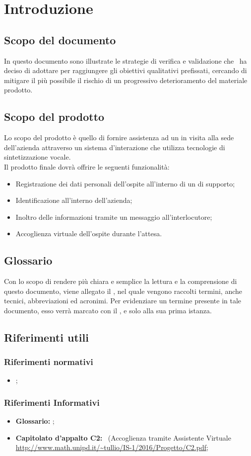 \documentclass[../PianoDiQualifica.tex]{subfiles}
\begin{document}
\section{Introduzione}

	\subsection{Scopo del documento}
	In questo documento sono illustrate le strategie di verifica e validazione che \kpanic\ ha deciso di adottare per raggiungere gli obiettivi qualitativi prefissati, cercando di mitigare il più possibile il rischio di un progressivo deterioramento del materiale prodotto.
	
	\subsection{Scopo del prodotto}
	Lo scopo del prodotto è quello di fornire assistenza ad un  in visita alla sede dell'azienda attraverso un sistema d'interazione che utilizza tecnologie di sintetizzazione vocale.
	\\Il prodotto finale dovrà offrire le seguenti funzionalità:
	\begin{itemize}
		\item Registrazione dei dati personali dell'ospite all'interno di un  di supporto;
		\item Identificazione  all'interno dell'azienda;
		\item Inoltro delle informazioni tramite un messaggio  all'interlocutore;
		\item Accoglienza virtuale dell'ospite durante l'attesa.
	\end{itemize}

	\subsection{Glossario}
	Con lo scopo di rendere più chiara e semplice la lettura e la comprensione di questo documento, viene allegato il \glossariov, nel quale vengono raccolti termini, anche tecnici, abbreviazioni ed acronimi. Per evidenziare un termine presente in tale documento, esso verrà marcato con il , e solo alla sua prima istanza.
	
	\subsection{Riferimenti utili}
		\subsubsection{Riferimenti normativi}
		\begin{itemize}
			\item \textbf{\normediprogettov};
		\end{itemize}
	
		\subsubsection{Riferimenti Informativi}	
		\begin{itemize}
			\item \textbf{Glossario:} \glossariov;
			\item\textbf{Capitolato d'appalto C2:} \progetto\ (Accoglienza tramite Assistente Virtuale \url{http://www.math.unipd.it/~tullio/IS-1/2016/Progetto/C2.pdf};
		\end{itemize}
			
\end{document}
